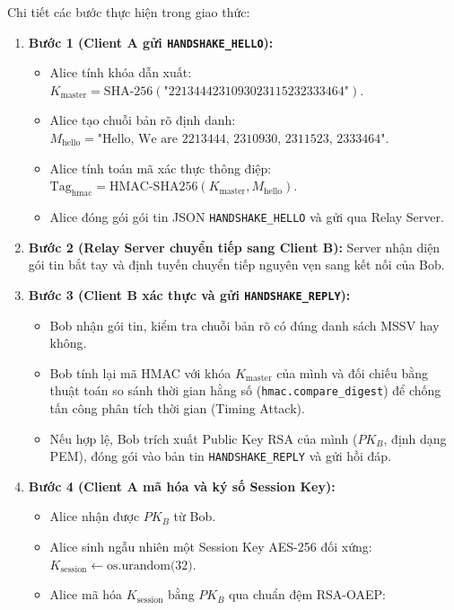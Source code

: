\documentclass[a4paper,12pt]{article}
\begin{document}
Chi tiết các bước thực hiện trong giao thức:
\begin{enumerate}
    \item \textbf{Bước 1 (Client A gửi \texttt{HANDSHAKE\_HELLO}):}
    \begin{itemize}
        \item Alice tính khóa dẫn xuất: $K_{\text{master}} = \text{SHA-256}(\text{"2213444231093023115232333464"})$.
        \item Alice tạo chuỗi bản rõ định danh:\\
\hspace*{1em}$M_{\text{hello}} = \text{"Hello, We are 2213444, 2310930, 2311523, 2333464"}$.
        \item Alice tính toán mã xác thực thông điệp: $\text{Tag}_{\text{hmac}} = \text{HMAC-SHA256}(K_{\text{master}}, M_{\text{hello}})$.
        \item Alice đóng gói gói tin JSON \texttt{HANDSHAKE\_HELLO} và gửi qua Relay Server.
    \end{itemize}
    \item \textbf{Bước 2 (Relay Server chuyển tiếp sang Client B):} Server nhận diện gói tin bắt tay và định tuyến chuyển tiếp nguyên vẹn sang kết nối của Bob.
    \item \textbf{Bước 3 (Client B xác thực và gửi \texttt{HANDSHAKE\_REPLY}):}
    \begin{itemize}
        \item Bob nhận gói tin, kiểm tra chuỗi bản rõ có đúng danh sách MSSV hay không.
        \item Bob tính lại mã HMAC với khóa $K_{\text{master}}$ của mình và đối chiếu bằng thuật toán so sánh thời gian hằng số (\texttt{hmac.compare\_digest}) để chống tấn công phân tích thời gian (Timing Attack).
        \item Nếu hợp lệ, Bob trích xuất Public Key RSA của mình ($PK_B$, định dạng PEM), đóng gói vào bản tin \texttt{HANDSHAKE\_REPLY} và gửi hồi đáp.
    \end{itemize}
    \item \textbf{Bước 4 (Client A mã hóa và ký số Session Key):}
    \begin{itemize}
        \item Alice nhận được $PK_B$ từ Bob.
        \item Alice sinh ngẫu nhiên một Session Key AES-256 đối xứng:\\
\hspace*{1em}$K_{\text{session}} \leftarrow \text{os.urandom(32)}$.
        \item Alice mã hóa $K_{\text{session}}$ bằng $PK_B$ qua chuẩn đệm RSA-OAEP:\\

\end{itemize}
\end{enumerate}
\end{document}
